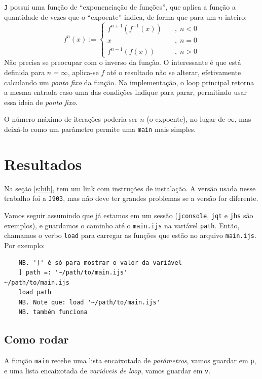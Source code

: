\documentclass{article}
\newcommand{\lang}{\texttt{J}}
\newcommand{\jver}{\texttt{J903}}
\newcommand{\inlcode}{\texttt}
\newcommand{\file}{\texttt}
\begin{document}
\lang{} possui uma função de ``exponenciação de funções'',
que aplica a função a quantidade de vezes que o ``expoente'' indica,
de forma que para um \(n\) inteiro:
\[
    f^n(x) := \begin{cases}
        f^{n+1}(f^{-1}(x))  &\quad,\; n < 0 \\
        x                   &\quad,\; n = 0 \\
        f^{n-1}(f(x))       &\quad,\; n > 0
    \end{cases}
\]
Não precisa se preocupar com o inverso da função.
O interessante é que está definida para \(n = \infty\),
aplica-se \(f\) até o resultado não se alterar,
efetivamente calculando um \emph{ponto fixo} da função.
Na implementação, o loop principal retorna
a mesma entrada caso uma das condições indique para parar,
permitindo usar essa ideia de \emph{ponto fixo}.

O número máximo de iterações poderia ser \(n\) (o expoente),
no lugar de \(\infty\),
mas deixá-lo como um parâmetro
permite uma \inlcode{main} mais simples.

\section{Resultados}

Na seção \ref{s:bib},
tem um link com instruções de instalação.
A versão usada nesse trabalho foi a \jver{},
mas não deve ter grandes problemas se a versão for diferente.

Vamos seguir assumindo que já estamos em um sessão
(\texttt{jconsole}, \texttt{jqt} e \texttt{jhs} são exemplos),
e guardamos o caminho
até o \file{main.ijs} na variável \inlcode{path}.
Então, chamamos o verbo \inlcode{load}
para carregar as funções que estão no arquivo \file{main.ijs}.
Por exemplo:
\begin{verbatim}
    NB. ']' é só para mostrar o valor da variável
    ] path =: '~/path/to/main.ijs'
~/path/to/main.ijs
    load path
    NB. Note que: load '~/path/to/main.ijs'
    NB. também funciona
\end{verbatim}

\subsection{Como rodar}
A função \inlcode{main} recebe
uma lista encaixotada de \emph{parâmetros},
vamos guardar em \inlcode{p}, e
uma lista encaixotada de \emph{variáveis de loop},
vamos guardar em \inlcode{v}.
\end{document}
